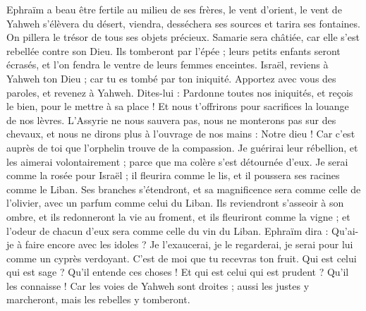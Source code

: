 \begin{multicols}{2}
Ephraïm a beau être fertile au milieu de ses frères, le vent d'orient, le vent de Yahweh s'élèvera du désert, viendra, desséchera ses sources et tarira ses fontaines. On pillera le trésor de tous ses objets précieux.
Samarie sera châtiée, car elle s'est rebellée contre son Dieu. Ils tomberont par l'épée ; leurs petits enfants seront écrasés, et l'on fendra le ventre de leurs femmes enceintes.
\VerseOne{}Israël, reviens à Yahweh ton Dieu ; car tu es tombé par ton iniquité.
Apportez avec vous des paroles, et revenez à Yahweh. Dites-lui : Pardonne toutes nos iniquités, et reçois le bien, pour le mettre à sa place ! Et nous t'offrirons pour sacrifices la louange de nos lèvres.
L'Assyrie ne nous sauvera pas, nous ne monterons pas sur des chevaux, et nous ne dirons plus à l'ouvrage de nos mains : Notre dieu ! Car c'est auprès de toi que l'orphelin trouve de la compassion.
Je guérirai leur rébellion, et les aimerai volontairement ; parce que ma colère s'est détournée d'eux.
Je serai comme la rosée pour Israël ; il fleurira comme le lis, et il poussera ses racines comme le Liban.
Ses branches s'étendront, et sa magnificence sera comme celle de l'olivier, avec un parfum comme celui du Liban.
Ils reviendront s'asseoir à son ombre, et ils redonneront la vie au froment, et ils fleuriront comme la vigne ; et l'odeur de chacun d'eux sera comme celle du vin du Liban.
Ephraïm dira : Qu'ai-je à faire encore avec les idoles ? Je l'exaucerai, je le regarderai, je serai pour lui comme un cyprès verdoyant. C'est de moi que tu recevras ton fruit.
Qui est celui qui est sage ? Qu'il entende ces choses ! Et qui est celui qui est prudent ? Qu'il les connaisse ! Car les voies de Yahweh sont droites ; aussi les justes y marcheront, mais les rebelles y tomberont.
\PPE{}
\end{multicols}

